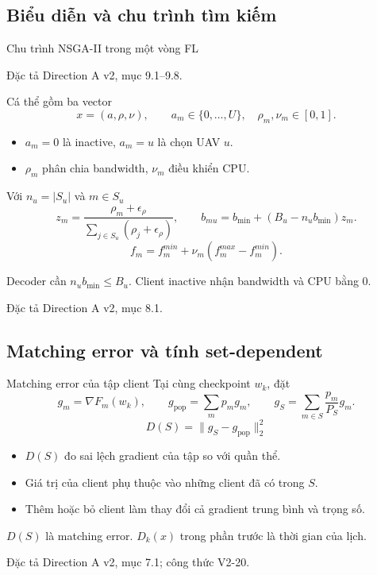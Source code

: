 \documentclass[10pt,aspectratio=43]{beamer}
\newcommand{\src}[1]{\par\vfill{\fontsize{6}{7.2}\selectfont\color{Muted}
 Đặc tả Direction A v2, mục #1.\par}}
\newcommand{\smallnote}[1]{\par{\footnotesize\color{Muted}#1\par}}
\newcommand{\pop}{\mathrm{pop}}
\begin{document}
\subsection{Biểu diễn và chu trình tìm kiếm}
\begin{frame}[t]{Chu trình NSGA-II trong một vòng FL}
\relax
\centering
{}
\src{9.1--9.8}
\end{frame}

\begin{frame}[t]{Cá thể gồm ba vector}
\relax
\[
x=(a,\rho,\nu),\qquad a_m\in\{0,\ldots,U\},
\quad \rho_m,\nu_m\in[0,1].
\]
\begin{itemize}
\item $a_m=0$ là inactive, $a_m=u$ là chọn UAV $u$.
\item $\rho_m$ phân chia bandwidth, $\nu_m$ điều khiển CPU.
\end{itemize}
Với $n_u=|S_u|$ và $m\in S_u$
\[
z_m=\frac{\rho_m+\epsilon_\rho}
{\sum_{j\in S_u}(\rho_j+\epsilon_\rho)},\qquad
b_{mu}=b_{\min}+(B_u-n_ub_{\min})z_m.
\]
\[
f_m=f_m^{min}+\nu_m(f_m^{max}-f_m^{min}).
\]
\smallnote{Decoder cần $n_ub_{\min}\le B_u$. Client inactive nhận bandwidth và CPU bằng 0.}
\src{8.1}
\end{frame}

\subsection{Matching error và tính set-dependent}
\begin{frame}[t]{Matching error của tập client}
\relax
Tại cùng checkpoint $w_k$, đặt
\[
g_m=\nabla F_m(w_k),\qquad
g_{\pop}=\sum_m p_mg_m,\qquad
g_S=\sum_{m\in S}\frac{p_m}{P_S}g_m.
\]
\[
\boxed{\displaystyle D(S)=\|g_S-g_{\pop}\|_2^2}
\]
\begin{itemize}
\item $D(S)$ đo sai lệch gradient của tập so với quần thể.
\item Giá trị của client phụ thuộc vào những client đã có trong $S$.
\item Thêm hoặc bỏ client làm thay đổi cả gradient trung bình và trọng số.
\end{itemize}
\smallnote{$D(S)$ là matching error. $D_k(x)$ trong phần trước là thời gian của lịch.}
\src{7.1; công thức V2-20}
\end{frame}
\end{document}
